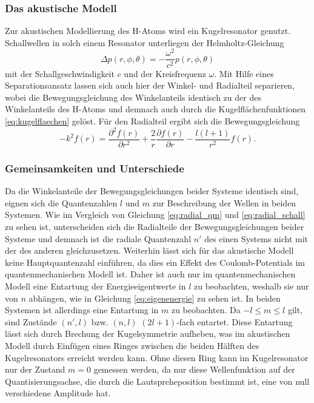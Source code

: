 \subsubsection{Das akustische Modell}
Zur akustischen Modellierung des H-Atoms wird ein Kugelresonator genutzt.
Schallwellen in solch einem Resonator unterliegen der Helmholtz-Gleichung
\begin{equation}
  \Delta p \left(r, \phi, \theta \right) = - \frac{\omega^2}{c^2} p \left(r, \phi, \theta \right)
\end{equation}
mit der Schallgeschwindigkeit $c$ und der Kreisfrequenz $\omega$.
Mit Hilfe eines Separationsansatz lassen sich auch hier der Winkel- und Radialteil separieren, wobei die Bewegungsgleichung des Winkelanteils identisch zu der des Winkelanteils des H-Atoms und demnach auch durch die Kugelflächenfunktionen \eqref{eq:kugelflaechen} gelöst. Für den Radialteil ergibt sich die Bewegungsgleichung
\begin{equation}
  - k^2 f(r) = \frac{\partial^2 f(r)}{\partial r^2} + \frac{2}{r} \frac{\partial f(r)}{\partial r} - \frac{l (l+1)}{r^2} f(r).
  \label{eq:radial_schall}
\end{equation}

\subsubsection{Gemeinsamkeiten und Unterschiede}
Da die Winkelanteile der Bewegungsgleichungen beider Systeme identisch sind, eignen sich die Quantenzahlen $l$ und $m$ zur Beschreibung der Wellen in beiden Systemen.
Wie im Vergleich von Gleichung \eqref{eq:radial_qm} und \eqref{eq:radial_schall} zu sehen ist, unterscheiden sich die Radialteile der Bewegungsgleichungen beider Systeme und demnach ist die radiale Quantenzahl $n'$ des einen Systems nicht mit der des anderen gleichzusetzen.
Weiterhin lässt sich für das akustische Modell keine Hauptquantenzahl einführen, da dies ein Effekt des Coulomb-Potentials im quantenmechanischen Modell ist.
Daher ist auch nur im quantenmechanischen Modell eine Entartung der Energieeigentwerte in $l$ zu beobachten, weshalb sie nur von $n$ abhängen, wie in Gleichung \eqref{eq:eigenenergie} zu sehen ist. In beiden Systemen ist allerdings eine Entartung in $m$ zu beobachten. Da $-l \leq m \leq l$ gilt, sind Zustände $(n', l)$ bzw. $(n, l)$ $(2l+1)$-fach entartet. Diese Entartung lässt sich durch Brechung der Kugelsymmetrie aufheben, was im akustischen Modell durch Einfügen eines Ringes zwischen die beiden Hälften des Kugelresonators erreicht werden kann. Ohne diesen Ring kann im Kugelresonator nur der Zustand $m=0$ gemessen werden, da nur diese Wellenfunktion auf der Quantisierungsachse, die durch die Lautspreheposition bestimmt ist, eine von null verschiedene Amplitude hat.

